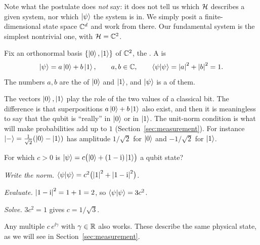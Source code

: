 Note what the postulate does \emph{not} say: it does not tell us which $\mathcal{H}$ describes a given system, nor which $\left|\psi\right\rangle$ the system is in. We simply posit a finite-dimensional state space $\mathbb{C}^d$ and work from there. Our fundamental system is the simplest nontrivial one, with $\mathcal{H}=\mathbb{C}^2$.

\begin{definition}[Qubit]\label{def:qubit}
  Fix an orthonormal basis $\{\left|0\right\rangle,\left|1\right\rangle\}$ of $\mathbb{C}^2$, the . A  is
  \[
    \left|\psi\right\rangle=a\left|0\right\rangle+b\left|1\right\rangle,\qquad a,b\in\mathbb{C},\qquad \left\langle\psi\middle|\psi\right\rangle=\left|a\right|^2+\left|b\right|^2=1 .
  \]
  The numbers $a,b$ are the  of $\left|0\right\rangle$ and $\left|1\right\rangle$, and $\left|\psi\right\rangle$ is a  of them.
\end{definition}

The vectors $\left|0\right\rangle,\left|1\right\rangle$ play the role of the two values of a classical bit. The difference is that superpositions $a\left|0\right\rangle+b\left|1\right\rangle$ also exist, and then it is meaningless to say that the qubit is ``really'' in $\left|0\right\rangle$ or in $\left|1\right\rangle$.
The unit-norm condition is what will make probabilities add up to $1$ (Section~\ref{sec:measurement}). For instance $\left|-\right\rangle=\frac1{\sqrt2}(\left|0\right\rangle-\left|1\right\rangle)$ has amplitude $1/\sqrt2$ for $\left|0\right\rangle$ and $-1/\sqrt2$ for $\left|1\right\rangle$.

\begin{example}\label{ex:normalise}
  For which $c>0$ is $\left|\psi\right\rangle=c\bigl(\left|0\right\rangle+(1-\mathrm{i})\left|1\right\rangle\bigr)$ a qubit state?
\end{example}
\begin{solution}
  \begin{steps}
    \item \emph{Write the norm.} $\left\langle\psi\middle|\psi\right\rangle=c^2\bigl(\left|1\right|^2+\left|1-\mathrm{i}\right|^2\bigr)$.
    \item \emph{Evaluate.} $\left|1-\mathrm{i}\right|^2=1+1=2$, so $\left\langle\psi\middle|\psi\right\rangle=3c^2$.
    \item \emph{Solve.} $3c^2=1$ gives $c=1/\sqrt3$.
  \end{steps}
  Any multiple $c\,e^{\ii\gamma}$ with $\gamma\in\mathbb{R}$ also works. These describe the same physical state, as we will see in Section~\ref{sec:measurement}.
\end{solution}

